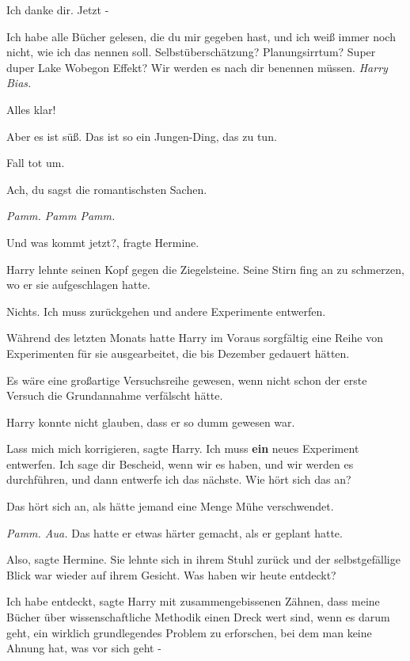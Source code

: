 \glqq Ich danke dir. Jetzt -\grqq{}

\glqq Ich habe alle Bücher gelesen, die du mir gegeben hast, und ich weiß immer
noch nicht, wie ich das nennen soll. Selbstüberschätzung? Planungsirrtum? Super
duper Lake Wobegon Effekt? Wir werden es nach dir benennen müssen. \emph{Harry
Bias.}\grqq{}

\glqq Alles klar!\grqq{}

\glqq Aber es ist süß. Das ist so ein Jungen-Ding, das zu tun.\grqq{}

\glqq Fall tot um.\grqq{}

\glqq Ach, du sagst die romantischsten Sachen.\grqq{}

\emph{Pamm. Pamm Pamm. }

\glqq Und was kommt jetzt?\grqq{}, fragte Hermine.

Harry lehnte seinen Kopf gegen die Ziegelsteine. Seine Stirn fing an zu
schmerzen, wo er sie aufgeschlagen hatte.

\glqq Nichts. Ich muss zurückgehen und andere Experimente entwerfen.\grqq{}

Während des letzten Monats hatte Harry im Voraus sorgfältig eine Reihe von
Experimenten für sie ausgearbeitet, die bis Dezember gedauert hätten.

Es wäre eine großartige Versuchsreihe gewesen, wenn nicht schon der erste
Versuch die Grundannahme verfälscht hätte.

Harry konnte nicht glauben, dass er so dumm gewesen war.

\glqq Lass mich mich korrigieren\grqq{}, sagte Harry. \glqq Ich muss
\textbf{ein} neues Experiment entwerfen. Ich sage dir Bescheid, wenn wir es
haben, und wir werden es durchführen, und dann entwerfe ich das nächste. Wie
hört sich das an?\grqq{}

\glqq Das hört sich an, als hätte jemand eine Menge Mühe verschwendet.\grqq{}

\emph{Pamm. Aua.} Das hatte er etwas härter gemacht, als er geplant hatte.

\glqq Also\grqq{}, sagte Hermine. Sie lehnte sich in ihrem Stuhl zurück und der
selbstgefällige Blick war wieder auf ihrem Gesicht. \glqq Was haben wir heute
entdeckt?\grqq{}

\glqq Ich habe entdeckt\grqq{}, sagte Harry mit zusammengebissenen Zähnen, \glqq
dass meine Bücher über wissenschaftliche Methodik einen Dreck wert sind, wenn es
darum geht, ein wirklich grundlegendes Problem zu erforschen, bei dem man keine
Ahnung hat, was vor sich geht -\grqq{}

